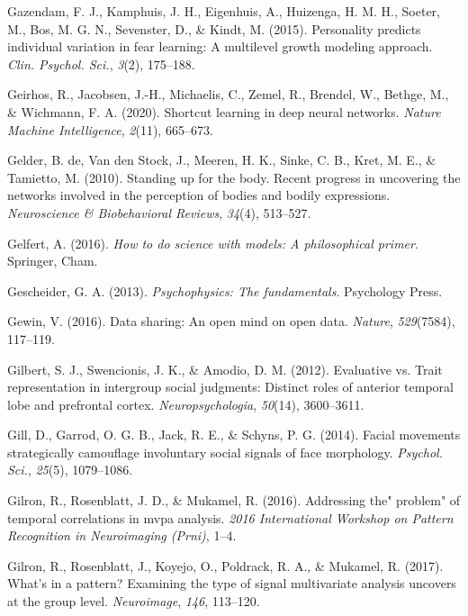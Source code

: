 \documentclass[12pt,american,a4paper,oneside,]{memoir} %
\begin{document}
\leavevmode\hypertarget{ref-Gazendam2015-fr}{}%
Gazendam, F. J., Kamphuis, J. H., Eigenhuis, A., Huizenga, H. M. H., Soeter, M., Bos, M. G. N., Sevenster, D., \& Kindt, M. (2015). Personality predicts individual variation in fear learning: A multilevel growth modeling approach. \emph{Clin. Psychol. Sci.}, \emph{3}(2), 175--188.

\leavevmode\hypertarget{ref-Geirhos2020-af}{}%
Geirhos, R., Jacobsen, J.-H., Michaelis, C., Zemel, R., Brendel, W., Bethge, M., \& Wichmann, F. A. (2020). Shortcut learning in deep neural networks. \emph{Nature Machine Intelligence}, \emph{2}(11), 665--673.

\leavevmode\hypertarget{ref-de2010standing}{}%
Gelder, B. de, Van den Stock, J., Meeren, H. K., Sinke, C. B., Kret, M. E., \& Tamietto, M. (2010). Standing up for the body. Recent progress in uncovering the networks involved in the perception of bodies and bodily expressions. \emph{Neuroscience \& Biobehavioral Reviews}, \emph{34}(4), 513--527.

\leavevmode\hypertarget{ref-Gelfert2016-hd}{}%
Gelfert, A. (2016). \emph{How to do science with models: A philosophical primer}. Springer, Cham.

\leavevmode\hypertarget{ref-Gescheider2013-zm}{}%
Gescheider, G. A. (2013). \emph{Psychophysics: The fundamentals}. Psychology Press.

\leavevmode\hypertarget{ref-Gewin2016-ff}{}%
Gewin, V. (2016). Data sharing: An open mind on open data. \emph{Nature}, \emph{529}(7584), 117--119.

\leavevmode\hypertarget{ref-gilbert2012evaluative}{}%
Gilbert, S. J., Swencionis, J. K., \& Amodio, D. M. (2012). Evaluative vs. Trait representation in intergroup social judgments: Distinct roles of anterior temporal lobe and prefrontal cortex. \emph{Neuropsychologia}, \emph{50}(14), 3600--3611.

\leavevmode\hypertarget{ref-Gill2014-hx}{}%
Gill, D., Garrod, O. G. B., Jack, R. E., \& Schyns, P. G. (2014). Facial movements strategically camouflage involuntary social signals of face morphology. \emph{Psychol. Sci.}, \emph{25}(5), 1079--1086.

\leavevmode\hypertarget{ref-gilron2016addressing}{}%
Gilron, R., Rosenblatt, J. D., \& Mukamel, R. (2016). Addressing the" problem" of temporal correlations in mvpa analysis. \emph{2016 International Workshop on Pattern Recognition in Neuroimaging (Prni)}, 1--4.

\leavevmode\hypertarget{ref-Gilron2017-tl}{}%
Gilron, R., Rosenblatt, J., Koyejo, O., Poldrack, R. A., \& Mukamel, R. (2017). What's in a pattern? Examining the type of signal multivariate analysis uncovers at the group level. \emph{Neuroimage}, \emph{146}, 113--120.
\end{document}
